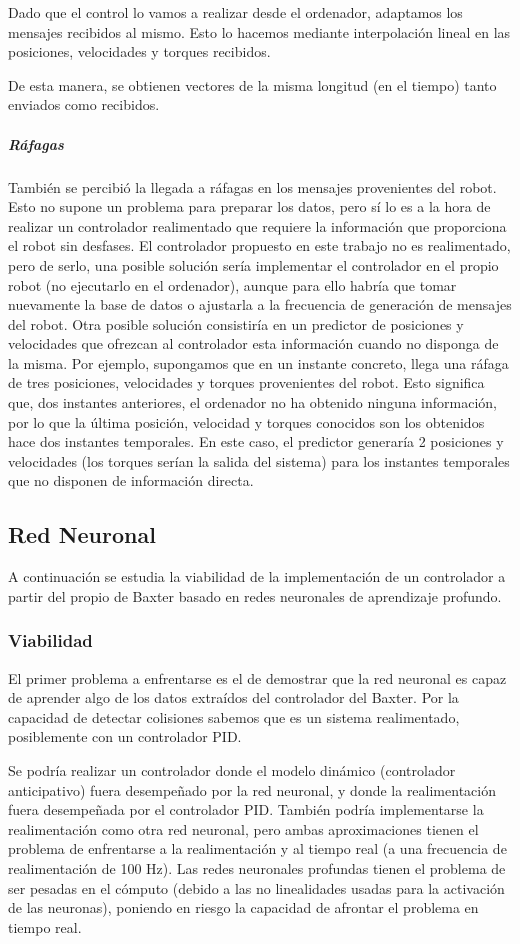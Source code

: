 Dado que el control lo vamos a realizar desde el ordenador, adaptamos los mensajes recibidos al mismo. Esto lo hacemos mediante interpolación lineal en las posiciones, velocidades y torques recibidos.

De esta manera, se obtienen vectores de la misma longitud (en el tiempo) tanto enviados como recibidos.

\subparagraph{Ráfagas}
También se percibió la llegada a ráfagas en los mensajes provenientes del robot. Esto no supone un problema para preparar los datos, pero sí lo es a la hora de realizar un controlador realimentado que requiere la información que proporciona el robot sin desfases. El controlador propuesto en este trabajo no es realimentado, pero de serlo, una posible solución sería implementar el controlador en el propio robot (no ejecutarlo en el ordenador), aunque para ello habría que tomar nuevamente la base de datos o ajustarla a la frecuencia de generación de mensajes del robot. Otra posible solución consistiría en un predictor de posiciones y velocidades que ofrezcan al controlador esta información cuando no disponga de la misma. Por ejemplo, supongamos que en un instante concreto, llega una ráfaga de tres posiciones, velocidades y torques provenientes del robot. Esto significa que, dos instantes anteriores, el ordenador no ha obtenido ninguna información, por lo que la última posición, velocidad y torques conocidos son los obtenidos hace dos instantes temporales. En este caso, el predictor generaría 2 posiciones y velocidades (los torques serían la salida del sistema) para los instantes temporales que no disponen de información directa.


\subsection{Red Neuronal}
A continuación se estudia la viabilidad de la implementación de un controlador a partir del propio de Baxter basado en redes neuronales de aprendizaje profundo.
\subsubsection{Viabilidad}
El primer problema a enfrentarse es el de demostrar que la red neuronal es capaz de aprender algo de los datos extraídos del controlador del Baxter. Por la capacidad de detectar colisiones sabemos que es un sistema realimentado, posiblemente con un controlador PID.

Se podría realizar un controlador donde el modelo dinámico (controlador anticipativo) fuera desempeñado por la red neuronal, y donde la realimentación fuera desempeñada por el controlador PID. También podría implementarse la realimentación como otra red neuronal, pero ambas aproximaciones tienen el problema de enfrentarse a la realimentación y al tiempo real (a una frecuencia de realimentación de 100 Hz). Las redes neuronales profundas tienen el problema de ser pesadas en el cómputo (debido a las no linealidades usadas para la activación de las neuronas), poniendo en riesgo la capacidad de afrontar el problema en tiempo real.

